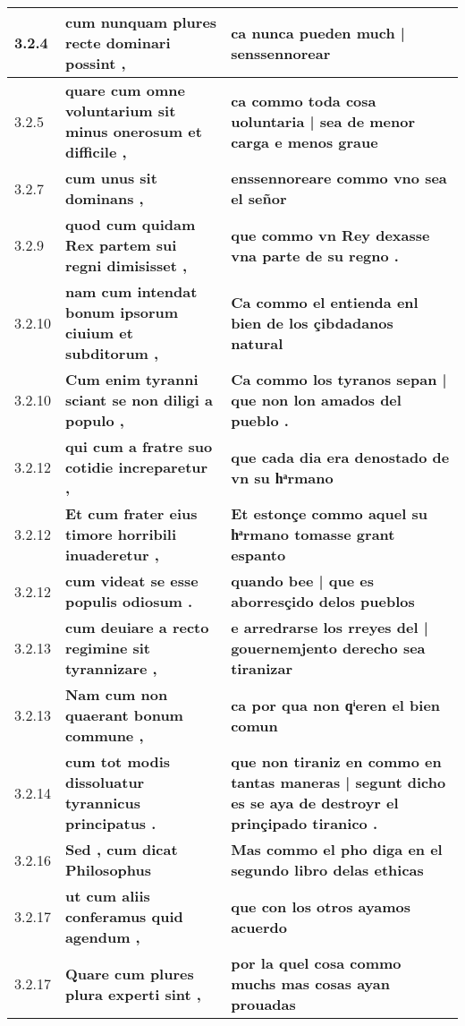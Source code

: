 \begin{tabular}{|p{1cm}|p{6.5cm}|p{6.5cm}|}
3.2.4 &  \textbf{ cum nunquam plures recte dominari possint , }  &  \textbf{ ca nunca pueden much | senssennorear }  \\\hline
3.2.5 &  \textbf{ quare cum omne voluntarium sit minus onerosum et difficile , }  &  \textbf{ ca commo toda cosa uoluntaria | sea de menor carga e menos graue }  \\\hline
3.2.7 &  \textbf{ cum unus sit dominans , }  &  \textbf{ enssennoreare commo vno sea el señor }  \\\hline
3.2.9 &  \textbf{ quod cum quidam Rex partem sui regni dimisisset , }  &  \textbf{ que commo vn Rey dexasse vna parte de su regno . }  \\\hline
3.2.10 &  \textbf{ nam cum intendat bonum ipsorum ciuium et subditorum , }  &  \textbf{ Ca commo el entienda enl bien de los çibdadanos natural }  \\\hline
3.2.10 &  \textbf{ Cum enim tyranni sciant se non diligi a populo , }  &  \textbf{ Ca commo los tyranos sepan | que non lon amados del pueblo . }  \\\hline
3.2.12 &  \textbf{ qui cum a fratre suo cotidie increparetur , }  &  \textbf{ que cada dia era denostado de vn su hͣrmano }  \\\hline
3.2.12 &  \textbf{ Et cum frater eius timore horribili inuaderetur , }  &  \textbf{ Et estonçe commo aquel su hͣrmano tomasse grant espanto }  \\\hline
3.2.12 &  \textbf{ cum videat se esse populis odiosum . }  &  \textbf{ quando bee | que es aborresçido delos pueblos }  \\\hline
3.2.13 &  \textbf{ cum deuiare a recto regimine sit tyrannizare , }  &  \textbf{ e arredrarse los rreyes del | gouernemjento derecho sea tiranizar }  \\\hline
3.2.13 &  \textbf{ Nam cum non quaerant bonum commune , }  &  \textbf{ ca por qua non qͥeren el bien comun }  \\\hline
3.2.14 &  \textbf{ cum tot modis dissoluatur tyrannicus principatus . }  &  \textbf{ que non tiraniz en commo en tantas maneras | segunt dicho es se aya de destroyr el prinçipado tiranico . }  \\\hline
3.2.16 &  \textbf{ Sed , cum dicat Philosophus }  &  \textbf{ Mas commo el pho diga en el segundo libro delas ethicas }  \\\hline
3.2.17 &  \textbf{ ut cum aliis conferamus quid agendum , }  &  \textbf{ que con los otros ayamos acuerdo }  \\\hline
3.2.17 &  \textbf{ Quare cum plures plura experti sint , }  &  \textbf{ por la quel cosa commo muchs mas cosas ayan prouadas }  \\\hline

\end{tabular}
